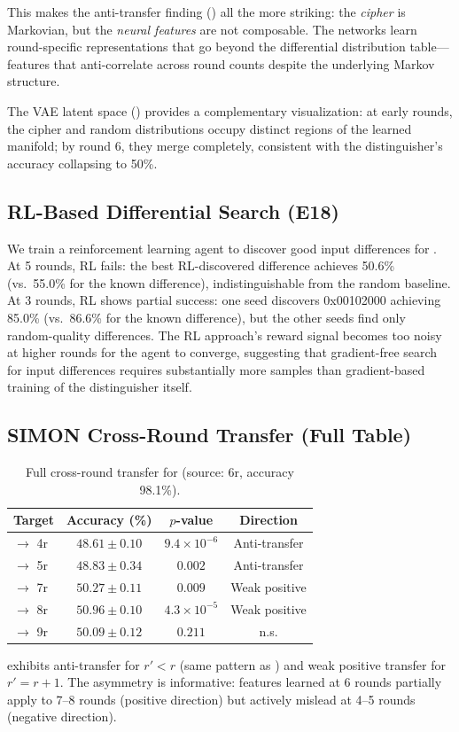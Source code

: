 This makes the anti-transfer finding () all the more striking: the \emph{cipher} is Markovian, but the \emph{neural features} are not composable.
The networks learn round-specific representations that go beyond the differential distribution table---features that anti-correlate across round counts despite the underlying Markov structure.

The VAE latent space () provides a complementary visualization: at early rounds, the cipher and random distributions occupy distinct regions of the learned manifold; by round 6, they merge completely, consistent with the distinguisher's accuracy collapsing to 50\%.

\FloatBarrier
\subsection{RL-Based Differential Search (E18)}

We train a reinforcement learning agent to discover good input differences for \speck.
At 5 rounds, RL fails: the best RL-discovered difference achieves 50.6\% (vs.\ 55.0\% for the known difference), indistinguishable from the random baseline.
At 3 rounds, RL shows partial success: one seed discovers 0x00102000 achieving 85.0\% (vs.\ 86.6\% for the known difference), but the other seeds find only random-quality differences.
The RL approach's reward signal becomes too noisy at higher rounds for the agent to converge, suggesting that gradient-free search for input differences requires substantially more samples than gradient-based training of the distinguisher itself.

\FloatBarrier
\subsection{SIMON Cross-Round Transfer (Full Table)}

\begin{table}[htbp]
\centering
\caption{Full cross-round transfer for \simon (source: 6r, accuracy 98.1\%).}
\label{tab:simon-transfer-full}
\begin{tabular}{@{}lccc@{}}
\toprule
\textbf{Target} & \textbf{Accuracy (\%)} & \textbf{$p$-value} & \textbf{Direction} \\
\midrule
$\to$ 4r & $48.61 \pm 0.10$ & $9.4 \times 10^{-6}$ & Anti-transfer \\
$\to$ 5r & $48.83 \pm 0.34$ & $0.002$ & Anti-transfer \\
$\to$ 7r & $50.27 \pm 0.11$ & $0.009$ & Weak positive \\
$\to$ 8r & $50.96 \pm 0.10$ & $4.3 \times 10^{-5}$ & Weak positive \\
$\to$ 9r & $50.09 \pm 0.12$ & $0.211$ & n.s. \\
\bottomrule
\end{tabular}
\end{table}

\simon exhibits anti-transfer for $r' < r$ (same pattern as \speck) and weak positive transfer for $r' = r+1$.
The asymmetry is informative: features learned at 6 rounds partially apply to 7--8 rounds (positive direction) but actively mislead at 4--5 rounds (negative direction).

